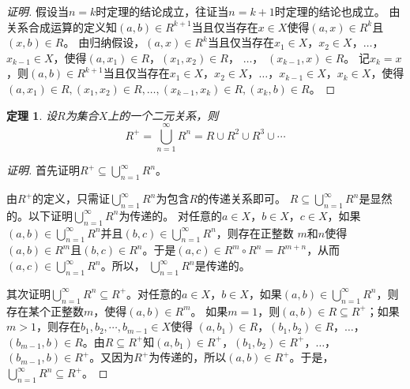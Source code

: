 \documentclass{book}[oneside]
\newtheorem{Thm}{定理}[chapter]
\begin{document}
\begin{CJK*}{UTF8}{gbsn}
\begin{proof}[证明]
   假设当$n=k$时定理的结论成立，往证当$n=k+1$时定理的结论也成立。
   由关系合成运算的定义知$(a,b)\in R^{k+1}$当且仅当存在$x\in X$使得$(a,x)\in R^k$且$(x, b)\in R$。 由归纳假设，$(a,x)\in R^k$当且仅当存在$x_1\in X$，$x_2\in X$，$\ldots$，$x_{k-1}\in X$，使得$(a, x_1) \in R$，$(x_1, x_2)\in R$，  $\ldots$， $(x_{k-1}, x)\in R$。 记$x_{k}=x$，则$(a,b)\in R^{k+1}$当且仅当存在$x_1\in X$，$x_2\in X$，$\ldots$，$x_{k-1}\in X$，$x_{k}\in X$，使得$(a, x_1) \in R,(x_1, x_2)\in R,\ldots,(x_{k-1}, x_k)\in R,(x_k, b)\in R$。
\end{proof}
  \begin{Thm}
    设$R$为集合$X$上的一个二元关系，则
    \begin{equation*}
      R^+ = \bigcup_{n=1}^\infty R^n = R \cup R^2 \cup R^3 \cup \cdots 
    \end{equation*}
  \end{Thm}
  \begin{proof}[证明]
    首先证明$ R^+ \subseteq \bigcup_{n=1}^\infty R^n$。

    由$R^+$的定义，只需证$\bigcup_{n=1}^\infty R^n$为包含$R$的传递关系即可。
    $R\subseteq \bigcup_{n=1}^\infty R^n$是显然的。以下证明$\bigcup_{n=1}^\infty R^n$为传递的。
    对任意的$a\in X$，$b\in X$，$c\in X$，如果$(a,b)\in \bigcup_{n=1}^\infty R^n$并且$(b,c)\in \bigcup_{n=1}^\infty R^n$，则存在正整数
    $m$和$n$使得$(a,b)\in R^m$且$(b,c)\in R^n$。于是$(a,c)\in R^m\circ R^n = R^{m+n}$，从而$(a,c)\in \bigcup_{n=1}^\infty R^n$。所以，
    $\bigcup_{n=1}^\infty R^n$是传递的。

    其次证明$  \bigcup_{n=1}^\infty R^n\subseteq R^+$。对任意的$a\in X$，$b\in X$，如果$(a,b)\in \bigcup_{n=1}^\infty R^n$，则存在某个正整数$m$，使得$(a,b)\in R^m$。
    如果$m=1$，则$(a,b)\in R\subseteq R^+$；如果$m>1$，则存在$b_1,b_2,\cdots, b_{m-1}\in X$使得
    $(a,b_1)\in R$，$(b_1,b_2)\in R$，$\ldots$，$(b_{m-1},b)\in R$。由$R\subseteq R^+$知$(a,b_1)\in R^+$，$(b_1,b_2)\in R^+$，$\ldots$，$(b_{m-1},b)\in R^+$。又因为$R^+$为传递的，所以$(a,b)\in R^+$。于是，$ \bigcup_{n=1}^\infty R^n\subseteq R^+$。


\end{proof}
\end{CJK*}
\end{document}
